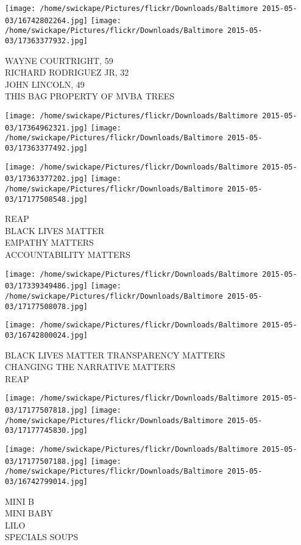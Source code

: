 \documentclass[10pt,letterpaper]{article}
\begin{document}
\texttt{[image: /home/swickape/Pictures/flickr/Downloads/Baltimore 2015-05-03/16742802264.jpg]}
\texttt{[image: /home/swickape/Pictures/flickr/Downloads/Baltimore 2015-05-03/17363377932.jpg]}

WAYNE COURTRIGHT, 59\\
RICHARD RODRIGUEZ JR, 32\\
JOHN LINCOLN, 49\\
THIS BAG PROPERTY OF MVBA TREES
\pagebreak

\texttt{[image: /home/swickape/Pictures/flickr/Downloads/Baltimore 2015-05-03/17364962321.jpg]}
\texttt{[image: /home/swickape/Pictures/flickr/Downloads/Baltimore 2015-05-03/17363377492.jpg]}

\texttt{[image: /home/swickape/Pictures/flickr/Downloads/Baltimore 2015-05-03/17363377202.jpg]}
\texttt{[image: /home/swickape/Pictures/flickr/Downloads/Baltimore 2015-05-03/17177508548.jpg]}

REAP\\
BLACK LIVES MATTER\\
EMPATHY MATTERS\\
ACCOUNTABILITY MATTERS
\pagebreak

\texttt{[image: /home/swickape/Pictures/flickr/Downloads/Baltimore 2015-05-03/17339349486.jpg]}
\texttt{[image: /home/swickape/Pictures/flickr/Downloads/Baltimore 2015-05-03/17177508078.jpg]}

\vspace{0.25in}
\texttt{[image: /home/swickape/Pictures/flickr/Downloads/Baltimore 2015-05-03/16742800024.jpg]}

BLACK LIVES MATTER TRANSPARENCY MATTERS\\
CHANGING THE NARRATIVE MATTERS\\
REAP
\pagebreak

\texttt{[image: /home/swickape/Pictures/flickr/Downloads/Baltimore 2015-05-03/17177507818.jpg]}
\texttt{[image: /home/swickape/Pictures/flickr/Downloads/Baltimore 2015-05-03/17177745830.jpg]}

\texttt{[image: /home/swickape/Pictures/flickr/Downloads/Baltimore 2015-05-03/17177507188.jpg]}
\texttt{[image: /home/swickape/Pictures/flickr/Downloads/Baltimore 2015-05-03/16742799014.jpg]}

MINI B\\
MINI BABY\\
LILO\\
SPECIALS SOUPS
\pagebreak
\end{document}

